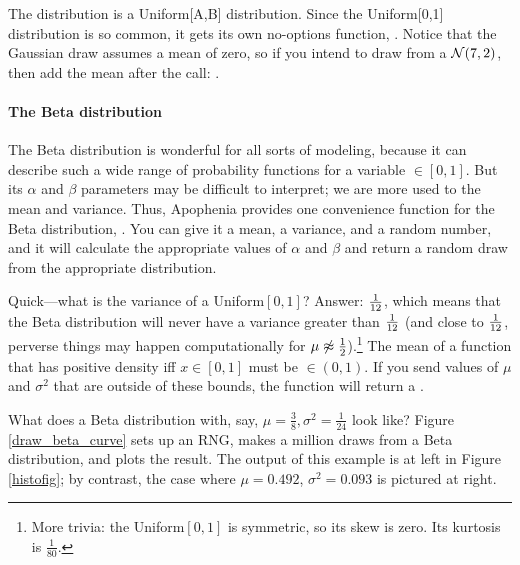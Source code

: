 The  distribution is a Uniform[A,B] distribution. Since the
Uniform[0,1] distribution is so common, it gets its own no-options
function, . Notice that the Gaussian draw
assumes a mean of zero, so if you intend to draw from a ${\cal N}(7,2)$,
then add the mean after the call: .



\paragraph{\treesymbol The Beta distribution}\label{beta}
The Beta distribution is wonderful for all sorts of modeling, because
it can describe such a wide range of probability functions for a
variable $\in [0,1]$.  But its $\alpha$ and $\beta$ parameters may be
difficult to interpret; we are more used to the mean and variance. Thus,
Apophenia provides one convenience function for the Beta distribution,
. You can give it a mean, a variance, and
a random number, and it will calculate the appropriate values of $\alpha$
and $\beta$ and return a random draw from the appropriate distribution.

Quick---what is the variance of a Uniform$[0,1]$? Answer: ${1\over 12}$,
which means that the Beta distribution will never have a variance greater
than ${1\over 12}$ (and close to ${1\over 12}$, perverse things may
happen computationally for $\mu \not\approx {1\over 2}$).\footnote{More
trivia: the Uniform$[0,1]$ is symmetric, so its skew is zero. Its
kurtosis is $\frac{1}{80}$.} The mean of a
function that has positive density iff $x \in [0,1]$ must be
$\in (0,1)$. If you send  values of $\mu$
and $\sigma^2$ that are outside of these bounds, the function will
return a .

What does a Beta distribution with, say, $\mu = \frac{3}{8}, \sigma^2 =
\frac{1}{24}$ look like? Figure \ref{draw_beta_curve} sets up an RNG,
makes a million draws from a Beta distribution, and plots the result.
The output of this example is at left in Figure \ref{histofig}; by
contrast, the case where $\mu=0.492$, $\sigma^2 = 0.093$ is pictured at
right.



